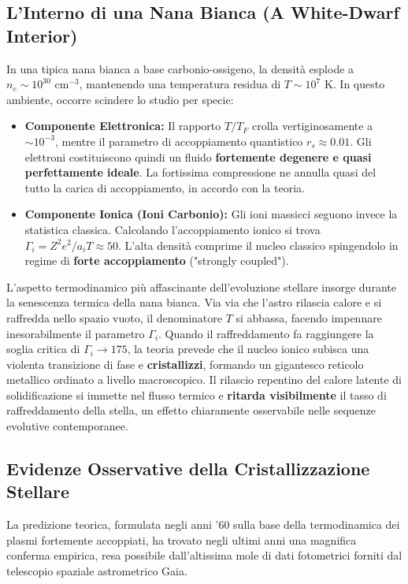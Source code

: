 \subsection{L'Interno di una Nana Bianca (A White-Dwarf Interior)}
In una tipica nana bianca a base carbonio-ossigeno, la densità esplode a $n_e \sim 10^{30} \text{ cm}^{-3}$, mantenendo una temperatura residua di $T \sim 10^7 \text{ K}$.
In questo ambiente, occorre scindere lo studio per specie:
\begin{itemize}
\item \textbf{Componente Elettronica:} Il rapporto $T/T_F$ crolla vertiginosamente a $\sim 10^{-3}$, mentre il parametro di accoppiamento quantistico $r_s \approx 0.01$. Gli elettroni costituiscono quindi un fluido \textbf{fortemente degenere e quasi perfettamente ideale}. La fortissima compressione ne annulla quasi del tutto la carica di accoppiamento, in accordo con la teoria.
\item \textbf{Componente Ionica (Ioni Carbonio):} Gli ioni massicci seguono invece la statistica classica. Calcolando l'accoppiamento ionico si trova $\Gamma_i = Z^2 e^2 / a_i T \approx 50$. L'alta densità comprime il nucleo classico spingendolo in regime di \textbf{forte accoppiamento} ("strongly coupled").
\end{itemize}
L'aspetto termodinamico più affascinante dell'evoluzione stellare insorge durante la senescenza termica della nana bianca. Via via che l'astro rilascia calore e si raffredda nello spazio vuoto, il denominatore $T$ si abbassa, facendo impennare inesorabilmente il parametro $\Gamma_i$. Quando il raffreddamento fa raggiungere la soglia critica di $\Gamma_i \to 175$, la teoria prevede che il nucleo ionico subisca una violenta transizione di fase e \textbf{cristallizzi}, formando un gigantesco reticolo metallico ordinato a livello macroscopico. Il rilascio repentino del calore latente di solidificazione si immette nel flusso termico e \textbf{ritarda visibilmente} il tasso di raffreddamento della stella, un effetto chiaramente osservabile nelle sequenze evolutive contemporanee.

\subsection{Evidenze Osservative della Cristallizzazione Stellare}
La predizione teorica, formulata negli anni '60 sulla base della termodinamica dei plasmi fortemente accoppiati, ha trovato negli ultimi anni una magnifica conferma empirica, resa possibile dall'altissima mole di dati fotometrici forniti dal telescopio spaziale astrometrico Gaia.

